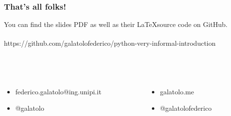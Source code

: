\documentclass{beamer}
\begin{document}
\begin{frame}
    \frametitle{That's all folks!}
    \begin{center}
        You can find the slides PDF as well as their \LaTeX \;source code on GitHub. \\
        \hfill \\
        https://github.com/galatolofederico/python-very-informal-introduction
    \end{center}
    \hfill \\
    \hfill \\
    \begin{columns}
        \begin{column}{.5\textwidth}
            \begin{itemize}
                \item [\faEnvelope] federico.galatolo@ing.unipi.it
                \item [\faPaperPlane] @galatolo
            \end{itemize}
        \end{column}
        \begin{column}{.5\textwidth}
            \begin{itemize}
                \item [\faGlobe] galatolo.me
                \item [\faGithub] @galatolofederico
            \end{itemize}
        \end{column}
    \end{columns}
\end{frame}
\end{document}
